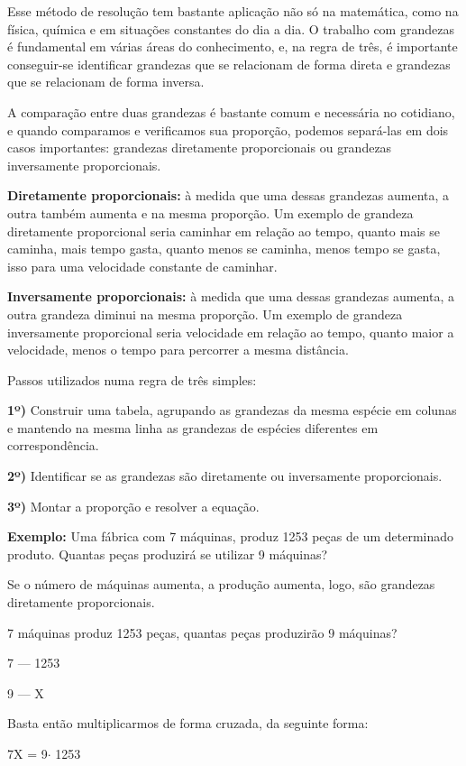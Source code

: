 \begin{multicols*}{2}
	Esse método de resolução tem bastante aplicação não só na matemática, como na física, química e em situações constantes do dia a dia. O trabalho com grandezas é fundamental em várias áreas do conhecimento, e, na regra de três, é importante conseguir-se identificar grandezas que se relacionam de forma direta e grandezas que se relacionam de forma inversa.

	A comparação entre duas grandezas é bastante comum e necessária no cotidiano, e quando comparamos e verificamos sua proporção, podemos separá-las em dois casos importantes: grandezas diretamente proporcionais ou grandezas inversamente proporcionais.

	\textbf{Diretamente proporcionais:} à medida que uma dessas grandezas aumenta, a outra também aumenta e na mesma proporção. Um exemplo de grandeza diretamente proporcional seria caminhar em relação ao tempo, quanto mais se caminha, mais tempo gasta, quanto menos se caminha, menos tempo se gasta, isso para uma velocidade constante de caminhar.

	\textbf{Inversamente proporcionais:} à medida que uma dessas grandezas aumenta, a outra grandeza diminui na mesma proporção. Um exemplo de grandeza inversamente proporcional seria velocidade em relação ao tempo, quanto maior a velocidade, menos o tempo para percorrer a mesma distância.

	Passos utilizados numa regra de três simples:

	\textbf{1º)} Construir uma tabela, agrupando as grandezas da mesma espécie em colunas e mantendo na mesma linha as grandezas de espécies diferentes em correspondência.

	\textbf{2º)} Identificar se as grandezas são diretamente ou inversamente proporcionais.

	\textbf{3º)} Montar a proporção e resolver a equação.

	\textbf{Exemplo:} Uma fábrica com 7 máquinas, produz 1253 peças de um determinado produto. Quantas peças produzirá se utilizar 9 máquinas?

	Se o número de máquinas aumenta, a produção aumenta, logo, são grandezas diretamente proporcionais.

	7 máquinas produz 1253 peças, quantas peças produzirão 9 máquinas?

	7  ---   1253

	9  ---      X

	Basta então multiplicarmos de forma cruzada, da seguinte forma:

	7X = 9$\cdot$ 1253  \\


\end{multicols*}
